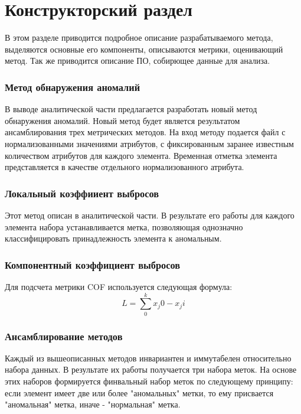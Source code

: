 \chapter{Конструкторский раздел}
В этом разделе приводится подробное описание разрабатываемого метода,
выделяются основные его компоненты, описываются метрики, оценивающий метод. Так же приводится описание ПО, собирющее данные для анализа.
\subsection{Метод обнаружения аномалий}
В выводе аналитической части предлагается разработать новый метод обнаружения аномалий. Новый метод будет является результатом ансамблирования трех метрических методов.
На вход методу подается файл с нормализованными значениями атрибутов, с фиксированным заранее известным количеством атрибутов для каждого элемента. Временная отметка элемента представляется в качестве отдельного нормализованного атрибута.
\subsection{Локальный коэффииент выбросов}
Этот метод описан в аналитической части. В результате его работы для каждого элемента набора устанавливается метка, позволяющая однозначно классифицировать принадлежность элемента к аномальным.

\subsection{Компонентный коэффициент выбросов}
Для подсчета метрики COF используется следующая формула:
\begin{equation}
L=\sum_{0}^{k}x_j0 - x_ji
\end{equation}
\subsection{Ансамблирование методов}
Каждый из вышеописанных методов инвариантен и иммутабелен относительно набора данных. В результате их работы получается три набора меток. На основе этих наборов формируется финвальный набор меток по следующему принципу: если элемент имеет две или более "аномальных" метки, то ему присвается "аномальная" метка, иначе - "нормальная" метка.
